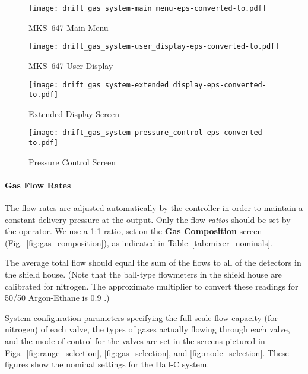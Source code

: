 %
\begin{center}
\begin{figure}[hbt]
\begin{minipage}{2.7in}
\texttt{[image: drift\_gas\_system-main\_menu-eps-converted-to.pdf]}
\caption{MKS~647 Main Menu\label{fig:main_menu}}
\end{minipage}
\begin{minipage}{2.7in}
\texttt{[image: drift\_gas\_system-user\_display-eps-converted-to.pdf]}
\caption{MKS~647 User Display\label{fig:user_display}}
\end{minipage}
\end{figure}
\end{center}
%
\begin{center}
\begin{figure}[hbt]
\begin{minipage}{2.7in}
\texttt{[image: drift\_gas\_system-extended\_display-eps-converted-to.pdf]}
\caption{Extended Display Screen\label{fig:extended_display}}
\end{minipage}
\begin{minipage}{2.7in}
\texttt{[image: drift\_gas\_system-pressure\_control-eps-converted-to.pdf]}
\caption{Pressure Control Screen\label{fig:pressure_control}}
\end{minipage}
\end{figure}
\end{center}
\paragraph{Gas Flow Rates}
\label{sec:gas_flow_rates}
The flow rates are adjusted automatically by the controller in order
to maintain a constant delivery pressure at the output. Only the flow
{\em ratios} should be set by the operator. We use a 1:1 ratio, set on
the {\bf Gas Composition} screen (Fig.~\ref{fig:gas_composition}), as
indicated in Table~\ref{tab:mixer_nominals}.

The average total flow should equal the sum of the flows to all of the
detectors in the shield house. (Note that the ball-type flowmeters in
the shield house are calibrated for nitrogen. The approximate
multiplier to convert these readings for 50/50 Argon-Ethane is 0.9 .)

System configuration parameters specifying the full-scale flow
capacity (for nitrogen) of each valve, the types of gases actually
flowing through each valve, and the mode of control for the valves are
set in the screens pictured in Figs.~\ref{fig:range_selection},
\ref{fig:gas_selection}, and \ref{fig:mode_selection}. These figures
show the nominal settings for the Hall-C system.

